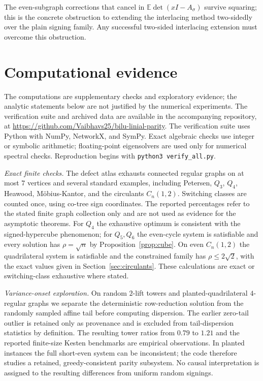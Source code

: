 \documentclass[11pt]{article}
\theoremstyle{remark}
\newcommand{\rhomax}{\rho}
\begin{document}
The even-subgraph corrections that cancel in
$\mathbb{E}\det(xI-A_\sigma)$ survive squaring; this is the concrete
obstruction to extending the interlacing method two-sidedly over the
plain signing family. Any successful two-sided interlacing extension
must overcome this obstruction.

\section{Computational evidence}\label{sec:experiments}

The computations are supplementary checks and exploratory evidence; the
analytic statements below are not justified by the numerical experiments.
The verification suite and archived data are available in the accompanying
repository, at \url{https://github.com/Vaibhavs25/bilu-linial-parity}. The
verification suite uses Python with NumPy, NetworkX, and SymPy. Exact algebraic
checks use integer or symbolic arithmetic; floating-point eigensolvers are used
only for numerical spectral checks. Reproduction begins with
\texttt{python3~verify\_all.py}.

\emph{Exact finite checks.} The defect atlas exhausts connected regular
graphs on at most $7$ vertices and several standard examples, including
Petersen, $Q_3$, $Q_4$, Heawood, M\"obius-Kantor, and the circulants
$C_n(1,2)$. Switching classes are counted once, using co-tree sign
coordinates. The reported percentages refer to the stated finite graph
collection only and are not used as evidence for the asymptotic theorems.
For $Q_4$ the exhaustive optimum is consistent with the signed-hypercube
phenomenon; for $Q_5,Q_6$ the even-cycle system is satisfiable and every
solution has $\rhomax=\sqrt n$ by Proposition~\ref{prop:cube}. On even
$C_n(1,2)$ the quadrilateral system is satisfiable and the constrained
family has $\rhomax\le2\sqrt2$, with the exact values given in
Section~\ref{sec:circulants}. These calculations are exact or
switching-class exhaustive where stated.

\emph{Variance-onset exploration.} On random $2$-lift towers and
planted-quadrilateral $4$-regular graphs we separate the deterministic
row-reduction solution from the randomly sampled affine tail before
computing dispersion. The earlier zero-tail outlier is retained only as
provenance and is excluded from tail-dispersion statistics by definition.
The resulting tower ratios from $0.79$ to $1.21$ and the reported finite-size
Kesten benchmarks are empirical observations. In planted instances the
full short-even system can be inconsistent; the code therefore studies a
retained, greedy-consistent parity subsystem. No causal interpretation is
assigned to the resulting differences from uniform random signings.
\end{document}

